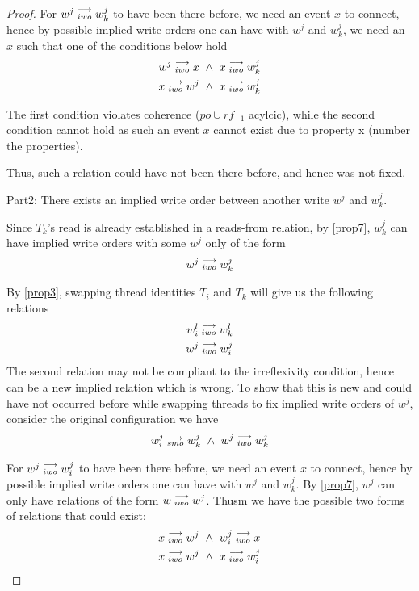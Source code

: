 \begin{proof}
                For $w^j\stackrel{\longrightarrow}{_{iwo}}w_k^j$ to have been there before, we need an event $x$ to connect, hence by possible implied write orders one can have with $w^j$ and $w_k^j$, we need an $x$ such that one of the conditions below hold
                \begin{align}
                    w^j\stackrel{\longrightarrow}{_{iwo}}x \ \wedge \ x\stackrel{\longrightarrow}{_{iwo}}w_k^j \\ 
                    x\stackrel{\longrightarrow}{_{iwo}}w^j \ \wedge \ x\stackrel{\longrightarrow}{_{iwo}}w_k^j
                \end{align}

                The first condition violates coherence ($po \cup rf_{-1}$ acylcic), while the second condition cannot hold as such an event $x$ cannot exist due to property x (number the properties).
                
                Thus, such a relation could have not been there before, and hence was not fixed. 


                Part2: There exists an implied write order between another write $w^j$ and $w_k^j$.

                Since $T_k$'s read is already established in a reads-from relation, by \ref{prop7}, $w_k^j$ can have implied write orders with some $w^j$ only of the form 
                \begin{align}
                    w^j\stackrel{\longrightarrow}{_{iwo}}w_k^j
                \end{align}

                By \ref{prop3}, swapping thread identities $T_i$ and $T_k$ will give us the following relations 
                \begin{align}
                    w_i^l\stackrel{\longrightarrow}{_{iwo}}w_k^l \\ 
                    w^j\stackrel{\longrightarrow}{_{iwo}}w_i^j 
                \end{align}
                The second relation may not be compliant to the irreflexivity condition, hence can be a new implied relation which is wrong. To show that this is new and could have not occurred before while swapping threads to fix implied write orders of $w^j$, consider the original configuration we have 
                \begin{align}
                    \reln{w_i^j}{smo}{w_k^j} \ \wedge \ \reln{w^j}{iwo}{w_k^j}
                \end{align}

                For $w^j\stackrel{\longrightarrow}{_{iwo}}w_i^j$ to have been there before, we need an event $x$ to connect, hence by possible implied write orders one can have with $w^j$ and $w_k^j$. By \ref{prop7}, $w^j$ can only have relations of the form $w\stackrel{\longrightarrow}{_{iwo}}w^j$. Thusm we have the possible two forms of relations that could exist:
                \begin{align}
                    x\stackrel{\longrightarrow}{_{iwo}}w^j \ \wedge \ w_i^j\stackrel{\longrightarrow}{_{iwo}}x \\
                    x\stackrel{\longrightarrow}{_{iwo}}w^j \ \wedge \ x\stackrel{\longrightarrow}{_{iwo}}w_i^j \\ 
                \end{align}


\end{proof}
